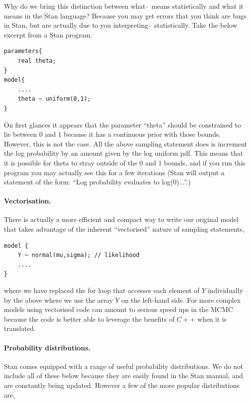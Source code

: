 \documentclass[11pt,fullpage]{book}
\begin{document}
Why do we bring this distinction between what $\tilde{~}$ means statistically and what it means in the Stan language? Because you may get errors that you think are bugs in Stan, but are actually due to you interpreting $\tilde{~}$ statistically. Take the below excerpt from a Stan program.

	\begin{verbatim}
parameters{
    real theta;
}
model{
    ....
    theta ~ uniform(0,1);
}
	\end{verbatim}

On first glances it appears that the parameter ``theta'' should be constrained to lie between 0 and 1 because it has a continuous prior with those bounds. However, this is not the case. All the above sampling statement does is increment the log probability by an amount given by the log uniform pdf. This means that it is possible for theta to stray outside of the 0 and 1 bounds, and if you run this program you may actually see this for a few iterations (Stan will output a statement of the form: ``Log probability evaluates to log(0)...''.)

\paragraph{Vectorisation.} There is actually a more efficient and compact way to write our original model that takes advantage of the inherent ``vectorised'' nature of sampling statements, 
	\begin{verbatim}
model {
    Y ~ normal(mu,sigma); // likelihood
    ....
}
	\end{verbatim}
where we have replaced the for loop that accesses each element of $Y$ individually by the above where we use the array $Y$ on the left-hand side. For more complex models using vectorised code can amount to serious speed ups in the MCMC because the code is better able to leverage the benefits of $C++$ when it is translated.

\paragraph{Probability distributions.} Stan comes equipped with a range of useful probability distributions. We do not include all of these below because they are easily found in the Stan manual, and are constantly being updated. However a few of the more popular distributions are,
\end{document}

